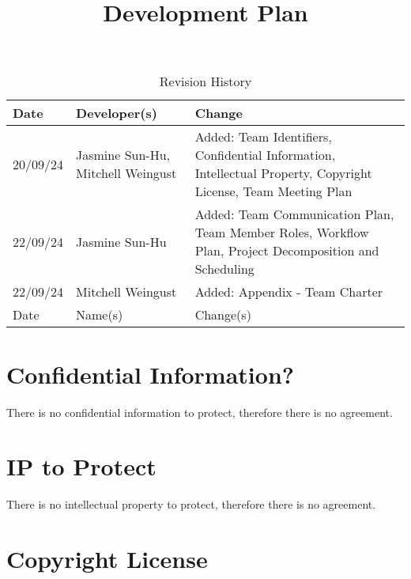 \documentclass{article}
\title{Development Plan\\\progname}
\author{\authname}
\date{}
\begin{document}
\maketitle

\begin{table}[hp]
\caption{Revision History} \label{TblRevisionHistory}
\begin{tabularx}{\textwidth}{p{1.5cm}p{3cm}X}
\toprule
\textbf{Date} & \textbf{Developer(s)} & \textbf{Change}\\
\midrule
20/09/24 & Jasmine Sun-Hu, Mitchell Weingust & Added: Team Identifiers, Confidential Information, Intellectual Property,
Copyright License, Team Meeting Plan\\
22/09/24 & Jasmine Sun-Hu & Added: Team Communication Plan, Team Member Roles, Workflow Plan, Project Decomposition and Scheduling\\
22/09/24 & Mitchell Weingust & Added: Appendix - Team Charter\\
Date & Name(s) & Change(s)\\
\bottomrule
\end{tabularx}
\end{table}

\newpage{}



\section{Confidential Information?}

There is no confidential information to protect, therefore there is no agreement.

\section{IP to Protect}

There is no intellectual property to protect, therefore there is no agreement.

\section{Copyright License}
\end{document}
